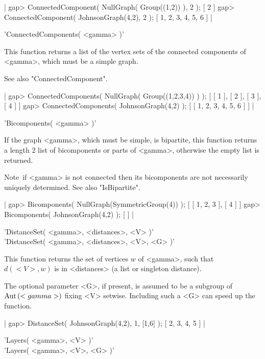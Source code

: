 |    gap> ConnectedComponent( NullGraph( Group((1,2)) ), 2 );
    [ 2 ]
    gap> ConnectedComponent( JohnsonGraph(4,2), 2 );
    [ 1, 2, 3, 4, 5, 6 ] |


'ConnectedComponents( <gamma> )'

This  function returns  a  list  of  the  vertex  sets  of  the connected
components of <gamma>, which must be a simple graph.

See also "ConnectedComponent".

|    gap> ConnectedComponents( NullGraph( Group((1,2,3,4)) ) );
    [ [ 1 ], [ 2 ], [ 3 ], [ 4 ] ]
    gap> ConnectedComponents( JohnsonGraph(4,2) );
    [ [ 1, 2, 3, 4, 5, 6 ] ] |


'Bicomponents( <gamma> )'

If the graph  <gamma>, which must be simple,  is bipartite, this function
returns  a length 2 list  of  bicomponents or parts of <gamma>, otherwise
the empty list is returned.

Note\:\ if  <gamma>  is  not  connected  then  its  bicomponents  are not
necessarily uniquely determined.  See also "IsBipartite".

|    gap> Bicomponents( NullGraph(SymmetricGroup(4)) );
    [ [ 1, 2, 3 ], [ 4 ] ]
    gap> Bicomponents( JohnsonGraph(4,2) );
    [  ] |


'DistanceSet( <gamma>, <distances>, <V> )' \\
'DistanceSet( <gamma>, <distances>, <V>, <G> )'

This function  returns the  set  of  vertices $w$ of  <gamma>,  such that
$d(<V>,w)$ is in <distances> (a list or singleton distance).

The optional  parameter <G>, if  present, is assumed to be  a subgroup of
${\rm Aut}\,(<gamma>)$  fixing <V> setwise.  Including  such a <G> can speed  up
the function.

|    gap> DistanceSet( JohnsonGraph(4,2), 1, [1,6] );
    [ 2, 3, 4, 5 ] |


'Layers( <gamma>, <V> )' \\
'Layers( <gamma>, <V>, <G> )'

